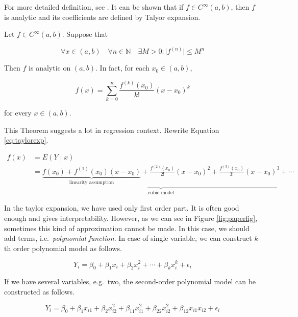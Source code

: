 \documentclass[]{book}
\theoremstyle{definition}
\theoremstyle{definition}
\theoremstyle{definition}
\theoremstyle{remark}
\let\BeginKnitrBlock\begin \let\EndKnitrBlock\end
\begin{document}
For more detailed definition, see \citet{Wade:2017aa}. It can be shown that if \(f \in C^{\infty}(a, b)\), then \(f\) is analytic and its coefficients are defined by Talyor expansion.

\BeginKnitrBlock{theorem}[Taylor expansion]
\protect\hypertarget{thm:taylor}{}{\label{thm:taylor} {} }Let \(f \in C^{\infty}(a, b)\). Suppose that

\[\forall x \in (a, b) \quad \forall n \in \mathbb{N} \quad \exists M > 0 : \lvert f^{(n)} \rvert \le M^n\]

Then \(f\) is analytic on \((a, b)\). In fact, for each \(x_0 \in (a, b)\),

\begin{equation}
  f(x) = \sum_{k = 0}^{\infty} \frac{f^{(k)}(x_0)}{k !} (x - x_0)^k
  \label{eq:taylorexp}
\end{equation}

for every \(x \in (a, b)\).
\EndKnitrBlock{theorem}

This Theorem suggests a lot in regression context. Rewrite Equation \eqref{eq:taylorexp}.

\begin{equation}
  \begin{split}
    f(x) & = E(Y \mid x) \\
    & = \underbrace{\underbrace{f(x_0) + f^{(1)}(x_0)(x - x_0)}_{\text{linearity assumption}} + \frac{f^{(2)}(x_0)}{2 !} (x - x_0)^2 + \frac{f^{(3)}(x_0)}{3 !} (x - x_0)^3}_{\text{cubic model}} + \cdots
  \end{split}
  \label{eq:polymod}
\end{equation}

In the taylor expansion, we have used only first order part. It is often good enough and gives interpretability. However, as we can see in Figure \ref{fig:paperfig}, sometimes this kind of approximation cannot be made. In this case, we should add terms, i.e.~\emph{polynomial function}. In case of single variable, we can construct \(k\)-th order polynomial model as follows.

\begin{equation}
  Y_i = \beta_0 + \beta_1 x_i + \beta_2 x_i^2 + \cdots + \beta_k x_i^k + \epsilon_i
  \label{eq:polyreg}
\end{equation}

If we have several variables, e.g.~two, the second-order polynomial model can be constructed as follows.

\begin{equation}
  Y_i = \beta_0 + \beta_1 x_{i1} + \beta_2 x_{i2}^2 + \beta_{11} x_{i1}^2 + \beta_{22} x_{i2}^2 + \beta_{12} x_{i1} x_{i2} + \epsilon_i
  \label{eq:polyreg2}
\end{equation}
\end{document}
